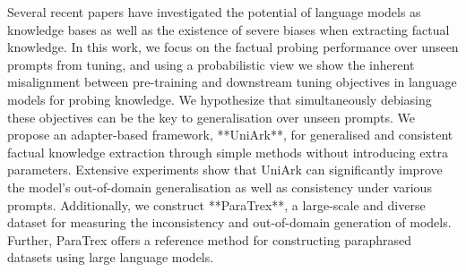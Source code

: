 Several recent papers have investigated the potential of language models as knowledge bases as well as the existence of severe biases when extracting factual knowledge. In this work, we focus on the factual probing performance over unseen prompts from tuning, and using a probabilistic view we show the inherent misalignment between pre-training and downstream tuning objectives in language models for probing knowledge. We hypothesize that simultaneously debiasing these objectives can be the key to generalisation over unseen prompts.  We propose an adapter-based framework, **UniArk**, for generalised and consistent factual knowledge extraction through simple methods without introducing extra parameters. Extensive experiments show that UniArk can significantly improve the model's out-of-domain generalisation as well as consistency under various prompts. Additionally, we construct **ParaTrex**, a large-scale and diverse dataset for measuring the inconsistency and out-of-domain generation of models. Further, ParaTrex offers a reference method for constructing paraphrased datasets using large language models.